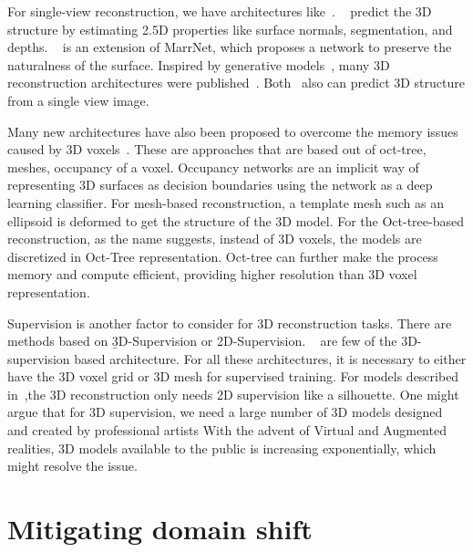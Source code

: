 For single-view reconstruction, we have architectures like~\cite{wu2017marrnet,z-gan, Yang_219, wu2018learning, popov2020corenet}.
~\cite{wu2017marrnet} predict the 3D structure by estimating 2.5D properties like surface normals, segmentation, and depths.
~\cite{wu2018learning} is an extension of MarrNet, which proposes a network to preserve the naturalness of the surface.
Inspired by generative models~\cite{Goodfellow2014GenerativeAN,kingma2014autoencoding}, many 3D reconstruction architectures were published~\cite{z-gan, Yang_219,wu2017learning,Lunz2020InverseGG}.
Both~\cite{Xie_2019, Xie_2020} also can predict 3D structure from a single view image.

Many new architectures have also been proposed to overcome the memory issues caused by 3D voxels~\cite{tatarchenko2017octree,Richter2018MatryoshkaNP,Mescheder2019OccupancyNL,Gkioxari2019MeshR, wang2018pixel2mesh,groueix2018atlasnet,pan2019deep}.
These are approaches that are based out of oct-tree, meshes, occupancy of a voxel.
Occupancy networks are an implicit way of representing 3D surfaces as decision boundaries using the network as a deep learning classifier.
For mesh-based reconstruction, a template mesh such as an ellipsoid is deformed to get the structure of the 3D model.
For the Oct-tree-based reconstruction, as the name suggests, instead of 3D voxels, the models are discretized in Oct-Tree representation.
Oct-tree can further make the process memory and compute efficient, providing higher resolution than 3D voxel representation.

Supervision is another factor to consider for 3D reconstruction tasks.
There are methods based on \b{3D-Supervision or 2D-Supervision}.
~\cite{Xie_2019,Xie_2020,wu2017marrnet,groueix2018atlasnet,pan2019deep, chen2019learning} are few of the 3D-supervision based architecture.
For all these architectures, it is necessary to either have the 3D voxel grid or 3D mesh for supervised training.
For models described in~\cite{Lunz2020InverseGG,henderson2019learning},the 3D reconstruction only needs 2D supervision like a silhouette.
One might argue that for 3D supervision, we need a large number of 3D models designed and created by professional artists
With the advent of Virtual and Augmented realities, 3D models available to the public is increasing exponentially, which might resolve the issue.

\section{Mitigating domain shift}\label{sec:mitigating_domain_shift}

